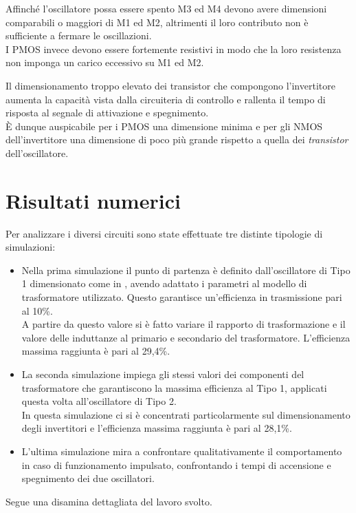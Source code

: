 \documentclass[a4paper, 12pt]{memoir}
\begin{document}
Affinché l'oscillatore possa essere spento M3 ed M4 devono avere dimensioni 
comparabili o maggiori di M1 ed M2, altrimenti il loro contributo non è 
sufficiente a fermare le oscillazioni.\\
I PMOS invece devono essere fortemente resistivi in modo che la loro resistenza
non imponga un carico eccessivo su M1 ed M2.

Il dimensionamento troppo elevato dei transistor che compongono l'invertitore
aumenta la capacità vista dalla circuiteria di controllo e rallenta il tempo di 
risposta al segnale di attivazione e spegnimento.\\
\`E dunque auspicabile per i PMOS una dimensione minima e per gli NMOS 
dell'invertitore una dimensione di poco più grande rispetto a quella dei
\emph{transistor} dell'oscillatore.

\chapter{Risultati numerici}
Per analizzare i diversi circuiti sono state effettuate tre distinte tipologie
di simulazioni:
\begin{itemize}
\item Nella prima simulazione il punto di partenza è definito dall'oscillatore
	di Tipo 1 dimensionato come in \cite{Neviani14}, avendo adattato i
	parametri al modello di trasformatore utilizzato. Questo garantisce
	un'efficienza in trasmissione pari al 10\%.\\
	A partire da questo valore si è fatto variare il rapporto di
	trasformazione e il valore delle induttanze al primario e secondario del
	trasformatore. L'efficienza massima raggiunta è pari al 29,4\%.

\item La seconda simulazione impiega gli stessi valori dei componenti del
	trasformatore che garantiscono la massima efficienza al Tipo 1, applicati
	questa volta all'oscillatore di Tipo 2.\\
	In questa simulazione ci si è concentrati particolarmente sul
	dimensionamento degli invertitori e l'efficienza massima raggiunta è pari
	al 28,1\%.

\item L'ultima simulazione mira a confrontare qualitativamente il comportamento
	in caso di funzionamento impulsato, confrontando i tempi di accensione e
	spegnimento dei due oscillatori.
\end{itemize}
Segue una disamina dettagliata del lavoro svolto.
\end{document}
